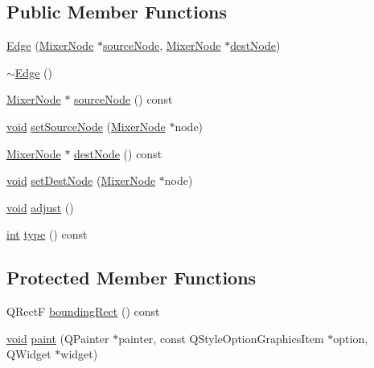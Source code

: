 \subsection*{Public Member Functions}
\begin{DoxyCompactItemize}
\item 
\hyperlink{group___u_a_v_object_widget_utils_gaaaf462ed746395725efc1ecc8ea00ec4}{Edge} (\hyperlink{class_mixer_node}{Mixer\-Node} $\ast$\hyperlink{group___u_a_v_object_widget_utils_ga9d06da5f40991dc21459764c5e3783b1}{source\-Node}, \hyperlink{class_mixer_node}{Mixer\-Node} $\ast$\hyperlink{group___u_a_v_object_widget_utils_ga63800818ac0cf98ea9cff4ba44532c4d}{dest\-Node})
\item 
\hyperlink{group___u_a_v_object_widget_utils_ga2f37b72f044427961d6730943daf10e0}{$\sim$\-Edge} ()
\item 
\hyperlink{class_mixer_node}{Mixer\-Node} $\ast$ \hyperlink{group___u_a_v_object_widget_utils_ga9d06da5f40991dc21459764c5e3783b1}{source\-Node} () const 
\item 
\hyperlink{group___u_a_v_objects_plugin_ga444cf2ff3f0ecbe028adce838d373f5c}{void} \hyperlink{group___u_a_v_object_widget_utils_gacc2025ad40fdd1225c77d3814bd356d2}{set\-Source\-Node} (\hyperlink{class_mixer_node}{Mixer\-Node} $\ast$node)
\item 
\hyperlink{class_mixer_node}{Mixer\-Node} $\ast$ \hyperlink{group___u_a_v_object_widget_utils_ga63800818ac0cf98ea9cff4ba44532c4d}{dest\-Node} () const 
\item 
\hyperlink{group___u_a_v_objects_plugin_ga444cf2ff3f0ecbe028adce838d373f5c}{void} \hyperlink{group___u_a_v_object_widget_utils_gac291239456c76a2347f0d94e1aa8b14c}{set\-Dest\-Node} (\hyperlink{class_mixer_node}{Mixer\-Node} $\ast$node)
\item 
\hyperlink{group___u_a_v_objects_plugin_ga444cf2ff3f0ecbe028adce838d373f5c}{void} \hyperlink{group___u_a_v_object_widget_utils_gab554a765fd7a57fcdf289aa51b4df328}{adjust} ()
\item 
\hyperlink{ioapi_8h_a787fa3cf048117ba7123753c1e74fcd6}{int} \hyperlink{group___u_a_v_object_widget_utils_ga8ad60980ad4024691e462442f64eb7d2}{type} () const 
\end{DoxyCompactItemize}
\subsection*{Protected Member Functions}
\begin{DoxyCompactItemize}
\item 
Q\-Rect\-F \hyperlink{group___u_a_v_object_widget_utils_ga1715832a609af81720fbed8340ddcd51}{bounding\-Rect} () const 
\item 
\hyperlink{group___u_a_v_objects_plugin_ga444cf2ff3f0ecbe028adce838d373f5c}{void} \hyperlink{group___u_a_v_object_widget_utils_ga6fb73701d0e4739f569e1ea0eb4c36fa}{paint} (Q\-Painter $\ast$painter, const Q\-Style\-Option\-Graphics\-Item $\ast$option, Q\-Widget $\ast$widget)
\end{DoxyCompactItemize}


